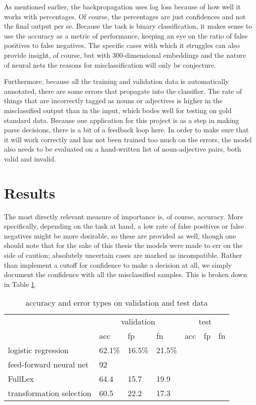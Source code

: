 \documentclass[a4paper, 11pt]{scrartcl}
\begin{document}
As mentioned earlier, the backpropagation uses log loss because of how well it works with percentages. Of course, the percentages are just confidences and not the final output per se. Because the task is binary classification, it makes sense to use the accuracy as a metric of performance, keeping an eye on the ratio of false positives to false negatives. The specific cases with which it struggles can also provide insight, of course, but with 300-dimensional embeddings and the nature of neural nets the reasons for misclassification will only be conjecture.

Furthermore, because all the training and validation data is automatically annotated, there are some errors that propagate into the classifier. The rate of things that are incorrectly tagged as nouns or adjectives is higher in the misclassified output than in the input, which bodes well for testing on gold standard data. Because one application for this project is as a step in making parse decisions, there is a bit of a feedback loop here. In order to make sure that it will work correctly and has not been trained too much on the errors, the model also needs to be evaluated on a hand-written list of noun-adjective pairs, both valid and invalid.


\section{Results}

The most directly relevant measure of importance is, of course, accuracy. More specifically, depending on the task at hand, a low rate of false positives or false negatives might be more desirable, so these are provided as well, though one should note that for the sake of this thesis the models were made to err on the side of caution; absolutely uncertain cases are marked as incompatible. Rather than implement a cutoff for confidence to make a decision at all, we simply document the confidence with all the misclassified samples. This is broken down in Table \ref{accuracy}.

\begin{table}[]
	\centering
	\begin{tabular}{l|lll|lll}
		                         & \multicolumn{3}{c|}{validation} & \multicolumn{3}{c}{test} \\
		                         & acc      & fp       & fn        & acc     & fp     & fn    \\ \hline
		logistic regression      & 62.1\%   & 16.5\%   & 21.5\%    &         &        &       \\
		feed-forward neural net  & 92       &          &           &         &        &       \\
		FullLex                  & 64.4     & 15.7     & 19.9      &         &        &       \\
		transformation selection & 60.5     & 22.2     & 17.3      &         &        &      
	\end{tabular}
	\caption{accuracy and error types on validation and test data}
	\label{accuracy}
\end{table}
\end{document}
